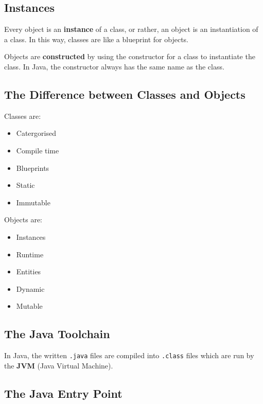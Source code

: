 \documentclass[a4paper, 12pt, twoside]{article}
\begin{document}
\subsection{Instances}

Every object is an \textbf{instance} of a class, or rather, an object
is an instantiation of a class. In this way, classes are like a
blueprint for objects.

\vspace{\baselineskip}

Objects are \textbf{constructed} by using the constructor for a class
to instantiate the class. In Java, the constructor always has the
same name as the class.

\newpage

\subsection{The Difference between Classes and Objects}

\begin{multicols}{2}
    Classes are:
    \begin{itemize}
        \item Catergorised
        \item Compile time
        \item Blueprints
        \item Static
        \item Immutable
    \end{itemize}
    \columnbreak
    Objects are:
    \begin{itemize}
        \item Instances
        \item Runtime
        \item Entities
        \item Dynamic
        \item Mutable
    \end{itemize}
\end{multicols}

\subsection{The Java Toolchain}

In Java, the written \texttt{.java} files are compiled into 
\texttt{.class} files which are run by the \textbf{JVM} (Java
Virtual Machine).

\subsection{The Java Entry Point}
\end{document}
